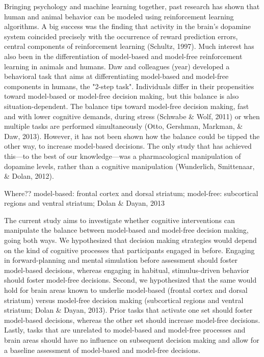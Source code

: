 \documentclass[11pt]{article} %
\begin{document}
Bringing psychology and machine learning together, past research has shown that human and animal behavior can be modeled using reinforcement learning algorithms. A big success was the finding that activity in the brain's dopamine system coincided precisely with the occurrence of reward prediction errors, central components of reinforcement learning (Schultz, 1997). Much interest has also been in the differentiation of model-based and model-free reinforcement learning in animals and humans. Daw and colleagues (year) developed a behavioral task that aims at differentiating model-based and model-free components in humans, the "2-step task". Individuals differ in their propensities toward model-based or model-free decision making, but this balance is also situation-dependent. The balance tips toward model-free decision making, fast and with lower cognitive demands, during stress (Schwabe \& Wolf, 2011) or when multiple tasks are performed simultaneously (Otto, Gershman, Markman, \& Daw, 2013). However, it has not been shown how the balance could be tipped the other way, to increase model-based decisions. The only study that has achieved this---to the best of our knowledge---was a pharmacological manipulation of dopamine levels, rather than a cognitive manipulation (Wunderlich, Smittenaar, \& Dolan, 2012).

Where?? model-based: frontal cortex and dorsal striatum; model-free: subcortical regions and ventral striatum; Dolan \& Dayan, 2013

The current study aims to investigate whether cognitive interventions can manipulate the balance between model-based and model-free decision making, going both ways. We hypothesized that decision making strategies would depend on the kind of cognitive processes that participants engaged in before. Engaging in forward-planning and mental simulation before assessment should foster model-based decisions, whereas engaging in habitual, stimulus-driven behavior should foster model-free decisions. Second, we hypothesized that the same would hold for brain areas known to underlie model-based (frontal cortex and dorsal striatum) versus model-free decision making (subcortical regions and ventral striatum; Dolan \& Dayan, 2013). Prior tasks that activate one set should foster model-based decisions, whereas the other set should increase model-free decisions. Lastly, tasks that are unrelated to model-based and model-free processes and brain areas should have no influence on subsequent decision making and allow for a baseline assessment of model-based and model-free decisions.
\end{document}
